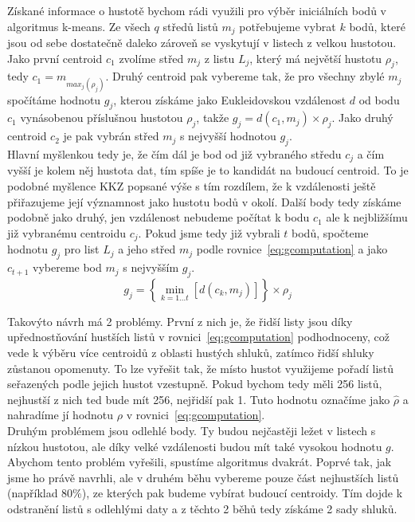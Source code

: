 Získané informace o hustotě bychom rádi využili pro výběr iniciálních bodů v algoritmus k-means. Ze všech $q$ středů listů $m_j$ potřebujeme vybrat $k$ bodů, které jsou od sebe dostatečně daleko zároveň se vyskytují v listech z velkou hustotou. Jako první centroid $c_1$ zvolíme střed $m_j$ z listu $L_j$, který má největší hustotu $\rho_j$, tedy $c_1=m_{max_j(\rho_j)}$. Druhý centroid pak vybereme tak, že pro všechny zbylé $m_j$ spočítáme hodnotu $g_j$, kterou získáme jako Eukleidovskou vzdálenost $d$ od bodu $c_1$ vynásobenou příslušnou hustotou $\rho_j$, takže $g_j=d(c_1,m_j) \times \rho_j$. Jako druhý centroid $c_2$ je pak vybrán střed $m_j$ s nejvyšší hodnotou $g_j$.\\

Hlavní myšlenkou tedy je, že čím dál je bod od již vybraného středu $c_j$ a čím vyšší je kolem něj hustota dat, tím spíše je to kandidát na budoucí centroid. To je podobné myšlence KKZ popsané výše s tím rozdílem, že k vzdálenosti ještě přiřazujeme její významnost jako hustotu bodů v okolí. Další body tedy získáme podobně jako druhý, jen vzdálenost nebudeme počítat k bodu $c_1$ ale k nejbližšímu již vybranému centroidu $c_j$. Pokud jsme tedy již vybrali $t$ bodů, spočteme hodnotu $g_j$ pro list $L_j$ a jeho střed $m_j$ podle rovnice~\ref{eq:gcomputation} a jako $c_{t+1}$ vybereme bod $m_j$ s nejvyšším $g_j$.\\
\begin{equation}\label{eq:gcomputation}
g_j = \left\{\min\limits_{k=1...t}\left[d\left( c_k,m_j \right)\right]\right\}\times\rho_j
\end{equation}

Takovýto návrh má 2 problémy. První z nich je, že řidší listy jsou díky upřednostňování hustších listů v rovnici~\ref{eq:gcomputation} podhodnoceny, což vede k výběru více centroidů z oblasti hustých shluků, zatímco řidší shluky zůstanou opomenuty. To lze vyřešit tak, že místo hustot využijeme pořadí listů seřazených podle jejich hustot vzestupně. Pokud bychom tedy měli 256 listů, nejhustší z nich ted bude mít 256, nejřidší pak 1. Tuto hodnotu označíme jako $\widehat{\rho}$ a nahradíme jí hodnotu $\rho$ v rovnici~\ref{eq:gcomputation}.\\

Druhým problémem jsou odlehlé body. Ty budou nejčastěji ležet v listech s nízkou hustotou, ale díky velké vzdálenosti budou mít také vysokou hodnotu $g$. Abychom tento problém vyřešili, spustíme algoritmus dvakrát. Poprvé tak, jak jsme ho právě navrhli, ale v druhém běhu vybereme pouze část nejhustších listů (například 80\%), ze kterých pak budeme vybírat budoucí centroidy. Tím dojde k odstranění listů s odlehlými daty a z těchto 2 běhů tedy získáme 2 sady shluků.

